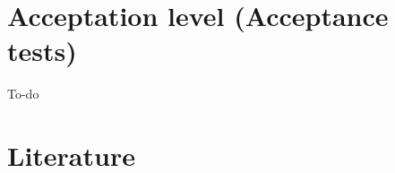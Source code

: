 \documentclass[signature]{deltares_report}
\begin{document}
\chapter{Acceptation level (Acceptance tests)}
\label{acceptanceTest}
To-do

\chapter{Literature}  \label{chapterLiterature}



\pagestyle{empty}
\mbox{}

\end{document}
